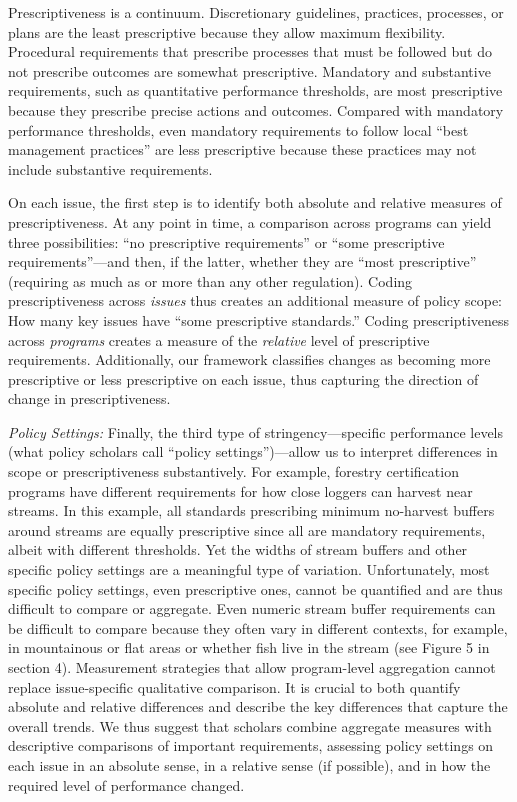 \documentclass[
      12pt,
            Review ]{article}
\begin{document}
Prescriptiveness is a continuum. Discretionary guidelines, practices, processes, or plans are the least prescriptive because they allow maximum flexibility. Procedural requirements that prescribe processes that must be followed but do not prescribe outcomes are somewhat prescriptive. Mandatory and substantive requirements, such as quantitative performance thresholds, are most prescriptive because they prescribe precise actions and outcomes. Compared with mandatory performance thresholds, even mandatory requirements to follow local ``best management practices'' are less prescriptive because these practices may not include substantive requirements.

On each issue, the first step is to identify both absolute and relative measures of prescriptiveness. At any point in time, a comparison across programs can yield three possibilities: ``no prescriptive requirements'' or ``some prescriptive requirements''---and then, if the latter, whether they are ``most prescriptive'' (requiring as much as or more than any other regulation). Coding prescriptiveness across \emph{issues} thus creates an additional measure of policy scope: How many key issues have ``some prescriptive standards.'' Coding prescriptiveness across \emph{programs} creates a measure of the \emph{relative} level of prescriptive requirements. Additionally, our framework classifies changes as becoming more prescriptive or less prescriptive on each issue, thus capturing the direction of change in prescriptiveness.



\emph{Policy Settings:} Finally, the third type of stringency---specific performance levels (what policy scholars call ``policy settings'')---allow us to interpret differences in scope or prescriptiveness substantively. For example, forestry certification programs have different requirements for how close loggers can harvest near streams. In this example, all standards prescribing minimum no-harvest buffers around streams are equally prescriptive since all are mandatory requirements, albeit with different thresholds. Yet the widths of stream buffers and other specific policy settings are a meaningful type of variation. Unfortunately, most specific policy settings, even prescriptive ones, cannot be quantified and are thus difficult to compare or aggregate. Even numeric stream buffer requirements can be difficult to compare because they often vary in different contexts, for example, in mountainous or flat areas or whether fish live in the stream (see Figure 5 in section 4). Measurement strategies that allow program-level aggregation cannot replace issue-specific qualitative comparison. It is crucial to both quantify absolute and relative differences and describe the key differences that capture the overall trends. We thus suggest that scholars combine aggregate measures with descriptive comparisons of important requirements, assessing policy settings on each issue in an absolute sense, in a relative sense (if possible), and in how the required level of performance changed.
\end{document}

